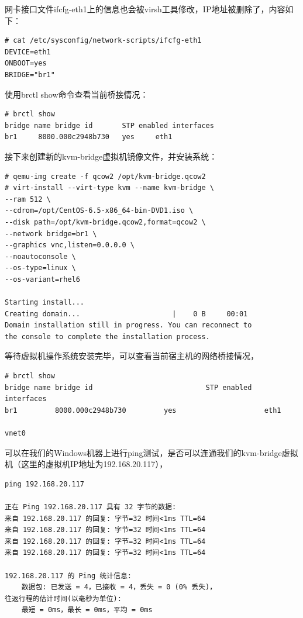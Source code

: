 网卡接口文件ifcfg-eth1上的信息也会被virsh工具修改，IP地址被删除了，内容如下：

\begin{verbatim}
# cat /etc/sysconfig/network-scripts/ifcfg-eth1
DEVICE=eth1
ONBOOT=yes
BRIDGE="br1"
\end{verbatim}

使用brctl show命令查看当前桥接情况：

\begin{verbatim}
# brctl show
bridge name	bridge id		STP enabled	interfaces
br1		8000.000c2948b730	yes		eth1
\end{verbatim}

接下来创建新的kvm-bridge虚拟机镜像文件，并安装系统：

\begin{verbatim}
# qemu-img create -f qcow2 /opt/kvm-bridge.qcow2
# virt-install --virt-type kvm --name kvm-bridge \
--ram 512 \
--cdrom=/opt/CentOS-6.5-x86_64-bin-DVD1.iso \
--disk path=/opt/kvm-bridge.qcow2,format=qcow2 \
--network bridge=br1 \
--graphics vnc,listen=0.0.0.0 \
--noautoconsole \
--os-type=linux \
--os-variant=rhel6

Starting install...
Creating domain...                      |    0 B     00:01     
Domain installation still in progress. You can reconnect to 
the console to complete the installation process.
\end{verbatim}

等待虚拟机操作系统安装完毕，可以查看当前宿主机的网络桥接情况，

\begin{verbatim}
# brctl show
bridge name	bridge id			                STP enabled		interfaces
br1			8000.000c2948b730		  yes		              eth1
														              vnet0
\end{verbatim}

可以在我们的Windows机器上进行ping测试，是否可以连通我们的kvm-bridge虚拟机（这里的虚拟机IP地址为192.168.20.117），

\begin{verbatim}
ping 192.168.20.117

正在 Ping 192.168.20.117 具有 32 字节的数据:
来自 192.168.20.117 的回复: 字节=32 时间<1ms TTL=64
来自 192.168.20.117 的回复: 字节=32 时间<1ms TTL=64
来自 192.168.20.117 的回复: 字节=32 时间<1ms TTL=64
来自 192.168.20.117 的回复: 字节=32 时间<1ms TTL=64

192.168.20.117 的 Ping 统计信息:
    数据包: 已发送 = 4，已接收 = 4，丢失 = 0 (0% 丢失)，
往返行程的估计时间(以毫秒为单位):
    最短 = 0ms，最长 = 0ms，平均 = 0ms
\end{verbatim}

